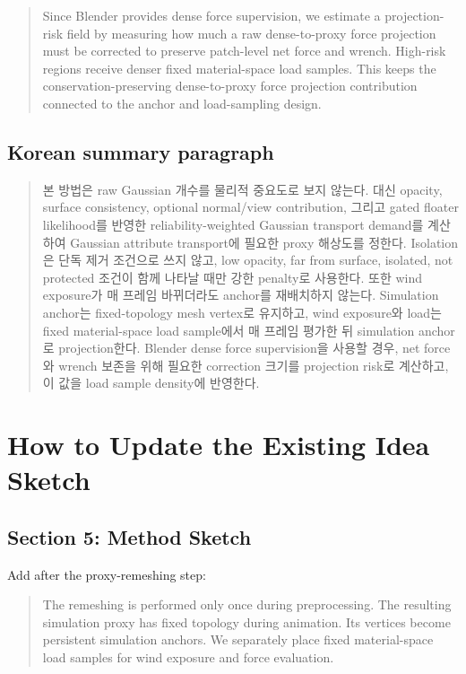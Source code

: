 \documentclass[11pt,a4paper]{article}
\begin{document}
\begin{quote}
Since Blender provides dense force supervision, we estimate a projection-risk field by measuring how much a raw dense-to-proxy force projection must be corrected to preserve patch-level net force and wrench. High-risk regions receive denser fixed material-space load samples. This keeps the conservation-preserving dense-to-proxy force projection contribution connected to the anchor and load-sampling design.
\end{quote}

\subsection{Korean summary paragraph}

\begin{quote}
본 방법은 raw Gaussian 개수를 물리적 중요도로 보지 않는다. 대신 opacity, surface consistency, optional normal/view contribution, 그리고 gated floater likelihood를 반영한 reliability-weighted Gaussian transport demand를 계산하여 Gaussian attribute transport에 필요한 proxy 해상도를 정한다. Isolation은 단독 제거 조건으로 쓰지 않고, low opacity, far from surface, isolated, not protected 조건이 함께 나타날 때만 강한 penalty로 사용한다. 또한 wind exposure가 매 프레임 바뀌더라도 anchor를 재배치하지 않는다. Simulation anchor는 fixed-topology mesh vertex로 유지하고, wind exposure와 load는 fixed material-space load sample에서 매 프레임 평가한 뒤 simulation anchor로 projection한다. Blender dense force supervision을 사용할 경우, net force와 wrench 보존을 위해 필요한 correction 크기를 projection risk로 계산하고, 이 값을 load sample density에 반영한다.
\end{quote}

\section{How to Update the Existing Idea Sketch}

\subsection{Section 5: Method Sketch}

Add after the proxy-remeshing step:

\begin{quote}
The remeshing is performed only once during preprocessing. The resulting simulation proxy has fixed topology during animation. Its vertices become persistent simulation anchors. We separately place fixed material-space load samples for wind exposure and force evaluation.
\end{quote}
\end{document}
